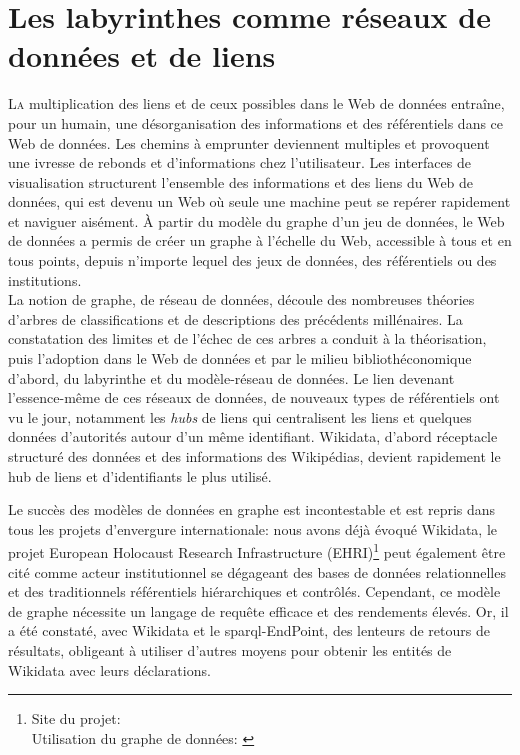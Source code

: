 \chapter{\label{III-A}Les labyrinthes comme réseaux de données et de liens}

\lettrine{L}a multiplication des liens et de ceux possibles dans le Web de données entraîne, pour un humain, une désorganisation des informations et des référentiels dans ce Web de données. Les chemins à emprunter deviennent multiples et provoquent une ivresse de rebonds et d'informations chez l'utilisateur. Les interfaces de visualisation structurent l'ensemble des informations et des liens du Web de données, qui est devenu un Web où seule une machine peut se repérer rapidement et naviguer aisément. À partir du modèle du graphe d'un jeu de données, le Web de données a permis de créer un graphe à l'échelle du Web, accessible à tous et en tous points, depuis n'importe lequel des jeux de données, des référentiels ou des institutions.\\

La notion de graphe, de réseau de données, découle des nombreuses théories d'arbres de classifications et de descriptions des précédents millénaires. La constatation des limites et de l'échec de ces arbres a conduit à la théorisation, puis l'adoption dans le Web de données et par le milieu bibliothéconomique d'abord, du labyrinthe et du modèle-réseau de données. Le lien devenant l'essence-même de ces réseaux de données, de nouveaux types de référentiels ont vu le jour, notamment les \textit{hubs} de liens qui centralisent les liens et quelques données d'autorités autour d'un même identifiant. Wikidata, d'abord réceptacle structuré des données et des informations des Wikipédias, devient rapidement le hub de liens et d'identifiants le plus utilisé.





\bigskip
\bigskip
\bigskip
Le succès des modèles de données en graphe est incontestable et est repris dans tous les projets d'envergure internationale: nous avons déjà évoqué Wikidata, le projet European Holocaust Research Infrastructure (EHRI)\footnote{Site du projet: \cite{noauthor_european_nodate}\\Utilisation du graphe de données: \cite{blanke_developing_2015}} peut également être cité comme acteur institutionnel se dégageant des bases de données relationnelles et des traditionnels référentiels hiérarchiques et contrôlés. Cependant, ce modèle de graphe nécessite un langage de requête efficace et des rendements élevés. Or, il a été constaté, avec Wikidata et le \ac{sparql}-EndPoint, des lenteurs de retours de résultats, obligeant à utiliser d'autres moyens pour obtenir les entités de Wikidata avec leurs déclarations.\\

